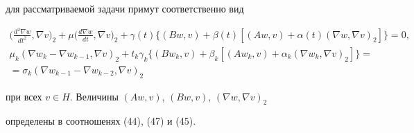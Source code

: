 для рассматриваемой задачи примут соответственно вид


\begin{gather*}


\bigg(\frac{d^2\nabla w}{dt^2},\nabla v \bigg)_2+\mu \bigg(\frac{d\nabla w}


{dt},\nabla v \bigg)_2+\gamma (t) \{(Bw,v)+\beta (t) [(Aw,v)+


\alpha (t)(\nabla w,\nabla v)_2 ] \}=0, \\


%


\mu_k(\nabla w_k-\nabla w_{k-1},\nabla v)_2+t_k\gamma_k \{(Bw_k,v)+


\beta_k [(Aw_k,v)+\alpha_k(\nabla w_k,\nabla v)_2 ] \}= \\


%


=\sigma_k(\nabla w_{k-1}-\nabla w_{k-2},\nabla v)_2


\end{gather*}


при всех $v \in H$. Величины $(Aw,v)$, $(Bw,v)$, $(\nabla w,\nabla v)_2$


определены в соотношенях (44), (47) и (45).





